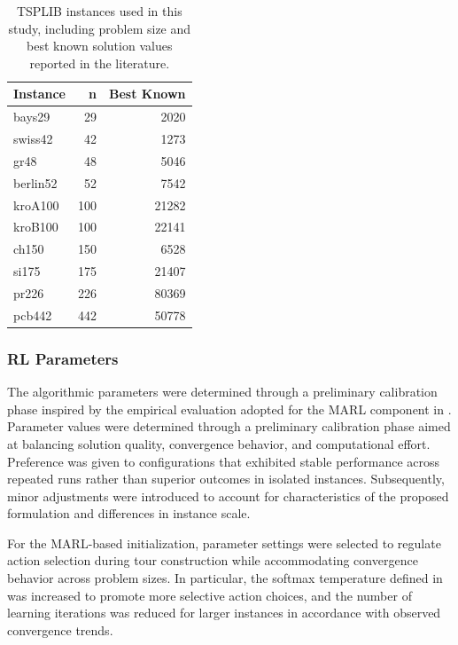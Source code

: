 \documentclass[runningheads]{llncs}
\begin{document}
{
\scriptsize
\setlength{\tabcolsep}{5pt}
\renewcommand{\arraystretch}{1.0}
\begin{table}[ht]
\centering
\caption{TSPLIB instances used in this study, including problem size and best known solution values reported in the literature.}
\label{tab:tsplib_best_known}
\begin{tabular}{lrr}
\toprule
\textbf{Instance} & \textbf{n} & \textbf{Best Known} \\
\midrule
bays29    & 29   & 2020  \\
swiss42   & 42   & 1273  \\
gr48      & 48   & 5046  \\
berlin52  & 52   & 7542  \\
kroA100   & 100  & 21282 \\
kroB100   & 100  & 22141 \\
ch150     & 150  & 6528  \\
si175     & 175  & 21407 \\
pr226     & 226  & 80369 \\
pcb442    & 442  & 50778 \\
\bottomrule
\end{tabular}
\end{table}
}

\subsubsection{RL Parameters}

The algorithmic parameters were determined through a preliminary calibration phase inspired by the empirical evaluation adopted for the MARL component in \cite{Alipour2015}. Parameter values were determined through a preliminary calibration phase aimed at balancing solution quality, convergence behavior, and computational effort. Preference was given to configurations that exhibited stable performance across repeated runs rather than superior outcomes in isolated instances. Subsequently, minor adjustments were introduced to account for characteristics of the proposed formulation and differences in instance scale.

For the MARL-based initialization, parameter settings were selected to regulate action selection during tour construction while accommodating convergence behavior across problem sizes. In particular, the softmax temperature defined in~\cite{Alipour2015} was increased to promote more selective action choices, and the number of learning iterations was reduced for larger instances in accordance with observed convergence trends.
\end{document}
